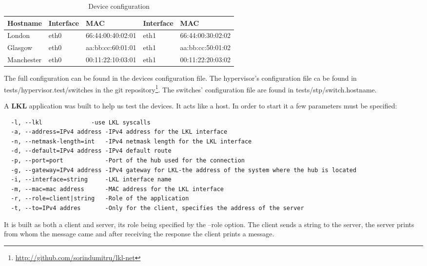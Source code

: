 
\begin{center}
  \begin{table}[htb]
  \begin{center}
  \begin{tabular}{| l | l | l | l | l |}
    \hline
      Hostname & Interface & MAC & Interface & MAC \\ \hline
      London & eth0 & 66:44:00:40:02:01 & eth1 & 66:44:00:30:02:02 \\ \hline
      Glasgow & eth0 & aa:bb:cc:60:01:01 & eth1 & aa:bb:cc:50:01:02 \\ \hline
      Manchester & eth0 & 00:11:22:10:03:01 & eth1 & 00:11:22:20:03:02 \\
    \hline
  \end{tabular}
  \end{center}
  \caption{Device configuration}
  \label{table:tdevices}
  \end{table}
\end{center}

The full configuration can be found in the devices configuration file. The hypervisor's configuration file
ca be found in tests/hypervisor.test/switches in the git repository\footnote{\url{http://github.com/sorindumitru/lkl-net}}.
The switches' configuration file are found in tests/stp/switch.hostname.

A \textbf{LKL} application was built to help us test the devices. It acts like a host. In order to start it
a few parameters must be specified:
\lstset{language=text, caption=Host options}
\begin{lstlisting} 
  -l, --lkl 		     -use LKL syscalls
  -a, --address=IPv4 address -IPv4 address for the LKL interface
  -n, --netmask-length=int   -IPv4 netmask length for the LKL interface
  -d, --default=IPv4 address -IPv4 default route
  -p, --port=port            -Port of the hub used for the connection
  -g, --gateway=IPv4 address -IPv4 gateway for LKL-the address of the system where the hub is located
  -i, --interface=string     -LKL interface name
  -m, --mac=mac address      -MAC address for the LKL interface
  -r, --role=client|string   -Role of the application
  -t, --to=IPv4 addres       -Only for the client, specifies the address of the server
\end{lstlisting}
It is built as both a client and server, its role being specified by the --role option. The client
sends a string to the server, the server prints from whom the message came and after receiving the response
the client prints a message.

